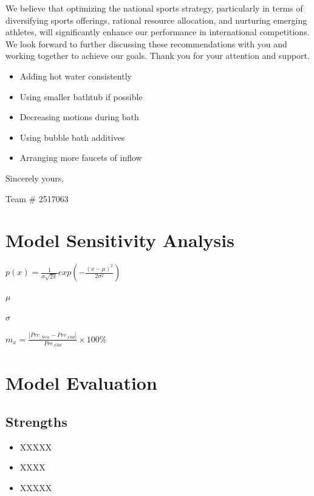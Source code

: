 \documentclass{mcmthesis}
\begin{document}
\begin{letter}
We believe that optimizing the national sports strategy, particularly in terms of diversifying sports offerings, rational resource allocation, and nurturing emerging athletes, will significantly enhance our performance in international competitions. We look forward to further discussing these recommendations with you and working together to achieve our goals.
Thank you for your attention and support.

\begin{itemize}
\item Adding hot water consistently
\item Using smaller bathtub if possible
\item Decreasing motions during bath
\item Using bubble bath additives
\item Arranging more faucets of inflow
\end{itemize}

\vspace{\parskip}

Sincerely yours,

Team \# 2517063

\end{letter}

\newpage

\section{Model Sensitivity Analysis}
$p(x)=\frac{1}{\sigma \sqrt{2\pi}}exp(-\frac{(x-\mu)^{2}}{2\sigma ^{2}})$

$\mu$

$\sigma$

$m_{x} = \frac{\left | Pre_{\_New} - Pre_{\_Old}\right |}{Pre_{\_Old}}\times 100\%$

\section{Model Evaluation}
\subsection{Strengths}
\begin{itemize}
\item XXXXX

\item XXXX

\item XXXXX
\end{itemize}
\end{document}
